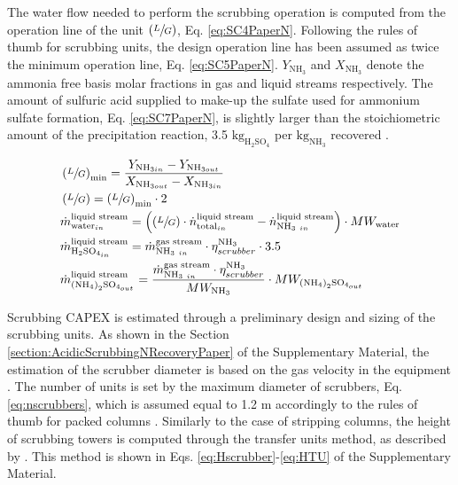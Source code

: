 \begin{refsection}[referencesCh6]
The water flow needed to perform the scrubbing operation is computed from the operation line of the unit $\left(\sfrac{L}{G}\right)$, Eq. \ref{eq:SC4PaperN}. Following the rules of thumb for scrubbing units, the design operation line has been assumed as twice the minimum operation line, Eq. \ref{eq:SC5PaperN}. $Y_{\text{NH}_3}$ and $X_{\text{NH}_3}$ denote the ammonia free basis molar fractions in gas and liquid streams respectively. The amount of sulfuric acid supplied to make-up the sulfate used for ammonium sulfate formation, Eq. \ref{eq:SC7PaperN}, is slightly larger than the stoichiometric amount of the precipitation reaction, 3.5 $\text{kg}_{\text{H}_2 \text{SO}_4}$ per ${\text{kg}_{\text{NH}_3}}$ recovered \citep{bolzonella2018nutrients}.

\begin{align}
& \left(\sfrac{L}{G}\right)_{\text{min}}= \frac{Y_{\text{NH}_{3 in}} - Y_{\text{NH}_{3 out}}}{X_{\text{NH}_{3 out}} - X_{\text{NH}_{3 in}}} \label{eq:SC4PaperN} 
\\
& \left(\sfrac{L}{G}\right)= \left(\sfrac{L}{G}\right)_{\text{min}} \cdot 2 \label{eq:SC5PaperN} 
\\
& \dot{m}_{\text{water}_{in}}^{\text{liquid stream}} = \left(\left(\sfrac{L}{G}\right) \cdot \dot{n}_{\text{total}_{in}}^{\text{liquid stream}} - \dot{n}_{\text{NH}_{3 \ in}}^{\text{liquid stream}}\right) \cdot MW_{\text{water}} \label{eq:SC6PaperN} 
\\
& \dot{m}_{\text{H}_2 \text{SO}_{4_{in}}}^{\text{liquid stream}} = \dot{m}_{\text{NH}_{3 \ in}}^{\text{gas stream}} \cdot \eta_{scrubber}^{\text{NH}_3} \cdot 3.5 \label{eq:SC7PaperN} 
\\
& \dot{m}_{\left(\text{NH}_4\right)_2 \text{SO}_{4_{out}}}^{\text{liquid stream}} = \frac{\dot{m}_{\text{NH}_{3 \ in}}^{\text{gas stream}} \cdot \eta_{scrubber}^{\text{NH}_3}}{MW_{\text{NH}_3}} \cdot MW_{\left(\text{NH}_4\right)_2 \text{SO}_{4_{out}}} \label{eq:SC8PaperN} 
\end{align}

Scrubbing CAPEX is estimated through a preliminary design and sizing of the scrubbing units. As shown in the
Section \ref{section:AcidicScrubbingNRecoveryPaper} of the Supplementary Material,
the estimation of the scrubber diameter is based on the gas velocity in the equipment \citep{melse2005}. The number of units is set by the maximum diameter of scrubbers, Eq. \ref{eq:nscrubbers}, which is assumed equal to 1.2 m accordingly to the rules of thumb for packed columns \citep{Branan}. Similarly to the case of stripping columns, the height of scrubbing towers is computed through the transfer units method, as described by \citet{couper2005chemical}. This method is shown in
Eqs. \ref{eq:Hscrubber}-\ref{eq:HTU} of the Supplementary Material.


\end{refsection}
